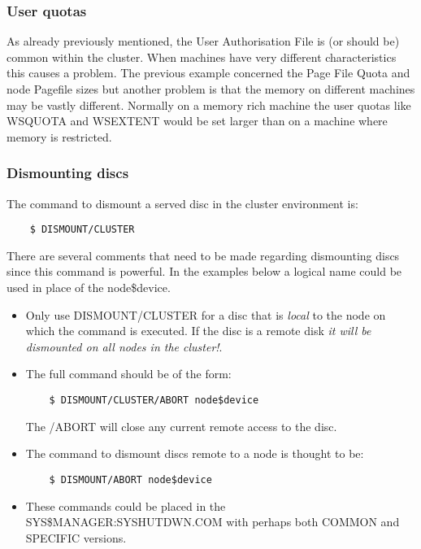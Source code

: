 \subsubsection {User quotas}
As already previously mentioned, the User Authorisation File is (or should
be) common within the cluster.
When machines have very different characteristics this causes a problem.
The previous example concerned the Page File Quota and node Pagefile sizes
but another problem is that the memory on different machines may be vastly
different.
Normally on a memory rich machine the user quotas like WSQUOTA and WSEXTENT
would be set larger than on a machine where memory is restricted.

\subsubsection {Dismounting discs}

The command to dismount a served disc in the cluster environment is:
\begin{verbatim}
    $ DISMOUNT/CLUSTER
\end{verbatim}
There are several comments that need to be made regarding dismounting discs
since this command is powerful.
In the examples below a logical name could be used in place of the node\$device.

\begin {itemize}
\item Only use DISMOUNT/CLUSTER for a disc that is {\em local} to the node
on which the command is executed.
If the disc is a remote disk {\em it will be dismounted on all nodes in the
cluster!}.

\item The full command should be of the form:
\begin{verbatim}
    $ DISMOUNT/CLUSTER/ABORT node$device
\end{verbatim}
The /ABORT will close any current remote access to the disc.

\item The command to dismount discs remote to a node is thought to be:
\begin{verbatim}
    $ DISMOUNT/ABORT node$device 
\end{verbatim}
\item These commands could be placed in the SYS\$MANAGER:SYSHUTDWN.COM
with perhaps both COMMON and SPECIFIC versions.
\end {itemize}

